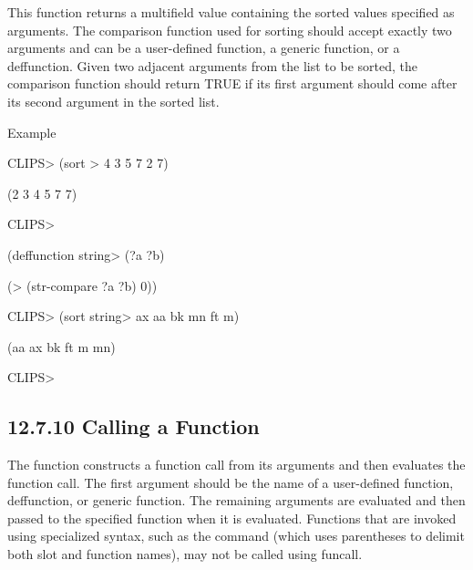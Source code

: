 \documentclass[letterpaper,10pt,english]{sphinxmanual}
\begin{document}

\begin{sphinxVerbatim}[commandchars=\\\{\}]
  
\end{sphinxVerbatim}

This function returns a multifield value containing the sorted values
specified as arguments. The comparison function used for sorting should
accept exactly two arguments and can be a user-defined function, a
generic function, or a deffunction. Given two adjacent arguments from
the list to be sorted, the comparison function should return TRUE if its
first argument should come after its second argument in the sorted list.

Example

CLIPS\textgreater{} (sort \textgreater{} 4 3 5 7 2 7)

(2 3 4 5 7 7)

CLIPS\textgreater{}

(deffunction string\textgreater{} (?a ?b)

(\textgreater{} (str-compare ?a ?b) 0))

CLIPS\textgreater{} (sort string\textgreater{} ax aa bk mn ft m)

(aa ax bk ft m mn)

CLIPS\textgreater{}


\subsection{12.7.10 Calling a Function}
\label{\detokenize{actions:calling-a-function}}
The function  constructs a function call from its arguments
and then evaluates the function call. The first argument should be the
name of a user-defined function, deffunction, or generic function. The
remaining arguments are evaluated and then passed to the specified
function when it is evaluated. Functions that are invoked using
specialized syntax, such as the  command (which uses
parentheses to delimit both slot and function names), may not be called
using funcall.


\begin{sphinxVerbatim}[commandchars=\\\{\}]
  
\end{sphinxVerbatim}
\end{document}

